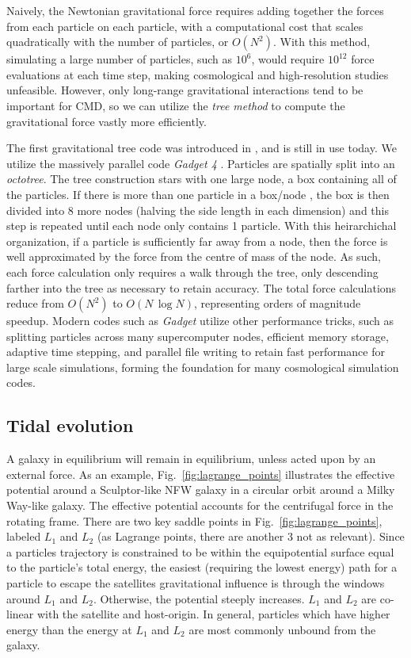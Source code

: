 Naively, the Newtonian gravitational force requires adding together the
forces from each particle on each particle, with a computational cost
that scales quadratically with the number of particles, or \(O(N^2)\).
With this method, simulating a large number of particles, such as
\(10^6\), would require \(10^{12}\) force evaluations at each time step,
making cosmological and high-resolution studies unfeasible. However,
only long-range gravitational interactions tend to be important for CMD,
so we can utilize the \emph{tree method} to compute the gravitational
force vastly more efficiently.

The first gravitational tree code was introduced in
\citet{barnes+hut1986}, and is still in use today. We utilize the
massively parallel code \emph{Gadget 4} \citep{gadget4}. Particles are
spatially split into an \emph{octotree}. The tree construction stars
with one large node, a box containing all of the particles. If there is
more than one particle in a box/node , the box is then divided into 8
more nodes (halving the side length in each dimension) and this step is
repeated until each node only contains 1 particle. With this
heirarchichal organization, if a particle is sufficiently far away from
a node, then the force is well approximated by the force from the centre
of mass of the node. As such, each force calculation only requires a
walk through the tree, only descending farther into the tree as
necessary to retain accuracy. The total force calculations reduce from
\(O(N^2)\) to \(O(N\,\log N)\), representing orders of magnitude
speedup. Modern codes such as \emph{Gadget} utilize other performance
tricks, such as splitting particles across many supercomputer nodes,
efficient memory storage, adaptive time stepping, and parallel file
writing to retain fast performance for large scale simulations, forming
the foundation for many cosmological simulation codes.

\subsection{Tidal evolution}\label{tidal-evolution}

A galaxy in equilibrium will remain in equilibrium, unless acted upon by
an external force. As an example, Fig.~\ref{fig:lagrange_points}
illustrates the effective potential around a Sculptor-like NFW galaxy in
a circular orbit around a Milky Way-like galaxy. The effective potential
accounts for the centrifugal force in the rotating frame. There are two
key saddle points in Fig.~\ref{fig:lagrange_points}, labeled \(L_1\) and
\(L_2\) (as Lagrange points, there are another 3 not as relevant). Since
a particles trajectory is constrained to be within the equipotential
surface equal to the particle's total energy, the easiest (requiring the
lowest energy) path for a particle to escape the satellites
gravitational influence is through the windows around \(L_1\) and
\(L_2\). Otherwise, the potential steeply increases. \(L_1\) and \(L_2\)
are co-linear with the satellite and host-origin. In general, particles
which have higher energy than the energy at \(L_1\) and \(L_2\) are most
commonly unbound from the galaxy.

